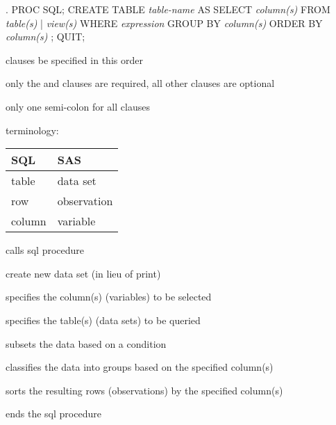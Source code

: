 \begin{frame}[fragile]
\begin{code}{.}
PROC SQL;
   CREATE TABLE \emph{table-name} AS
   SELECT \emph{column(s)}
   FROM \emph{table(s)} | \emph{view(s)}
   WHERE \emph{expression}
   GROUP BY \emph{column(s)}
   ORDER BY \emph{column(s)}
   ;
QUIT;
\end{code}
\emp
{} \hspace{0.05in} \emp
{}
\bi
\item clauses  be specified in this order
\item only the  and  clauses are required, all other clauses are optional
\item only one semi-colon for all clauses
\item terminology:
\item[]
\begin{tabular}{ll}
\hline
 SQL & SAS \\
\hline \hline
 table & data set \\
 row & observation  \\
 column & variable  \\
\hline
\end{tabular}
\ei
\emp
\end{frame}

\begin{frame}
 \hspace{0.05in}\emp
{}
\bi
\item[\ttt{PROC SQL}] calls sql procedure \vskip7pt
\item[\ttt{CREATE TABLE}] create new data set (in lieu of print) \vskip7pt
\item[\ttt{SELECT}] specifies the column(s) (variables) to be selected \vskip7pt
\item[\ttt{FROM}] specifies the table(s) (data sets) to be queried \vskip7pt
\item[\ttt{WHERE}] subsets the data based on a condition \vskip7pt
\item[\ttt{GROUP BY}] classifies the data into groups based on the specified column(s) \vskip7pt
\item[\ttt{ORDER BY}] sorts the resulting rows (observations) by the specified column(s) \vskip7pt
\item[\ttt{QUIT}] ends the sql procedure
\ei
\emp
\end{frame}

